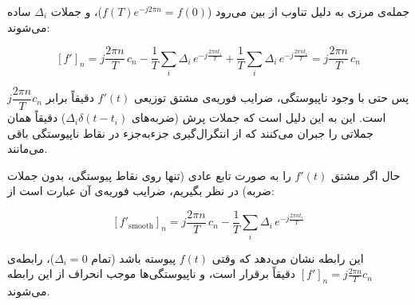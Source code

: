 جمله‌ی مرزی به دلیل تناوب از بین می‌رود ($f(T)e^{-j2\pi n}=f(0)$)، و جملات $\Delta_i$ ساده می‌شوند:

$$\boxed{[f']_n = j\frac{2\pi n}{T}\,c_n - \frac{1}{T}\sum_i \Delta_i\,e^{-j\frac{2\pi n t_i}{T}} + \frac{1}{T}\sum_i \Delta_i\,e^{-j\frac{2\pi n t_i}{T}} = j\frac{2\pi n}{T}\,c_n}$$

پس حتی با وجود ناپیوستگی، ضرایب فوریه‌ی مشتق توزیعی $f'(t)$ دقیقاً برابر $j\dfrac{2\pi n}{T}c_n$ است. این به این دلیل است که جملات پرش (ضربه‌های $\Delta_i\delta(t-t_i)$) دقیقاً همان جملاتی را جبران می‌کنند که از انتگرال‌گیری جزء‌به‌جزء در نقاط ناپیوستگی باقی می‌مانند.


حال اگر مشتق $f'(t)$ را به صورت تابع عادی (تنها روی نقاط پیوستگی، بدون جملات ضربه) در نظر بگیریم، ضرایب فوریه‌ی آن عبارت است از:

$$\boxed{[f'_{\text{smooth}}]_n = j\frac{2\pi n}{T}\,c_n - \frac{1}{T}\sum_i \Delta_i\,e^{-j\frac{2\pi n t_i}{T}}}$$

این رابطه نشان می‌دهد که وقتی $f(t)$ پیوسته باشد (تمام $\Delta_i=0$)، رابطه‌ی $[f']_n = j\frac{2\pi n}{T}c_n$ دقیقاً برقرار است، و ناپیوستگی‌ها موجب انحراف از این رابطه می‌شوند.
